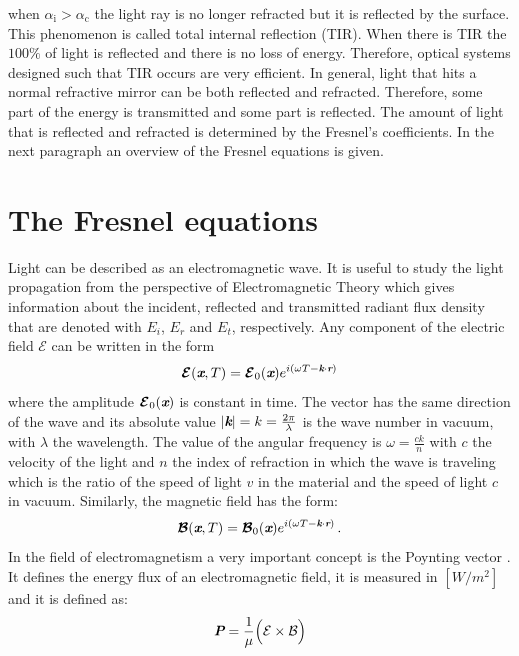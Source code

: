 when $\alpha_{\textrm{i}}>\alpha_{\textrm{c}}$ the light ray is no longer refracted but it is reflected by the surface. This phenomenon is called total internal reflection (TIR). When there is TIR the $100\%$ of light is reflected and there is no loss of energy. Therefore, optical systems designed such that TIR occurs are very efficient. In general, light that hits a normal refractive mirror can be both reflected and refracted. Therefore, some part of the energy is transmitted and some part is reflected. The amount of light that is reflected and refracted is determined by the Fresnel's coefficients.
In the next paragraph an overview of the Fresnel equations is given.

\section{The Fresnel equations}
Light can be described as an electromagnetic wave.
It is useful to study the light propagation from the perspective of Electromagnetic Theory which gives information about the incident, reflected and transmitted radiant flux density that are denoted with $E_i$, $E_r$ and $E_t$, respectively.  
Any component of the electric field $\boldsymbol{\mathcal{E}}$ can be written in the form
\begin{equation}
\boldsymbol{\mathcal{E}}(\textit{\textbf{x}}, T) = \boldsymbol{\mathcal{E}}_0(\textit{\textbf{x}} )e^{i(\omega T - \textit{\textbf{k}}\cdot \textit{\textbf{r}})}
\end{equation}
where the amplitude $\boldsymbol{\mathcal{E}}_0(\textit{\textbf{x}})$ is constant in time. The vector  has the same direction of the wave and its absolute value 
$|\textit{\textbf{k}}| = k = \frac{2\pi}{\lambda}$ is the wave number in vacuum, with $\lambda$ the wavelength. The value of the angular frequency is $\omega = \frac{c k}{n}$ with $c$ the velocity of the light and $n$ the index of refraction in which the wave is traveling which is the ratio of the speed of light $v$ in the material and the speed of light $c$ in vacuum.
Similarly, the magnetic field has the form:
\begin{equation}
\boldsymbol{\mathcal{B}}(\textit{\textbf{x}}, T) = \boldsymbol{\mathcal{B}}_0(\textit{\textbf{x}}) e^{i(\omega T - \textit{\textbf{k}}\cdot \textit{\textbf{r}})}\,.
\end{equation}
In the field of electromagnetism a very important concept is the Poynting vector . 
It defines the energy flux of an electromagnetic field,  it is measured in $[W/m^2]$ and it is defined as:
\begin{equation}
\textit{\textbf{P}} = \frac{1}{\mu}\Big(\mathcal{E}\times \mathcal{B}\Big)
\end{equation}
